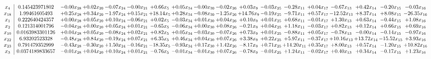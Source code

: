 \documentclass[9pt]{article}
\begin{document}
\[\begin{array}{c| c c@{\hskip 2pt} c@{\hskip 2pt} c@{\hskip 2pt} c@{\hskip 2pt} c@{\hskip 2pt} c@{\hskip 2pt} c@{\hskip 2pt} c@{\hskip 2pt} c@{\hskip 2pt} c@{\hskip 2pt} c@{\hskip 2pt} c@{\hskip 2pt} c@{\hskip 2pt} c@{\hskip 2pt} c@{\hskip 2pt} c@{\hskip 2pt} }
 x_{4}   &  0.145423971802 & -0.00 x_{28} & +  0.02 x_{20} & -0.07 x_{24} & -0.00 x_{21} & +  0.66 x_{5} & +  0.05 x_{34} & -0.00 x_{30} & -0.02 x_{26} & +  0.03 x_{9} & -0.03 x_{25} & -0.28 x_{11} & +  0.04 x_{17} & -0.67 x_{13} & +  0.42 x_{14} & -0.20 x_{15} & -0.03 x_{16}\\
 x_{18}   &  1.99461605493 & +  0.25 x_{28} & +  0.34 x_{20} & -1.97 x_{24} & +  0.15 x_{21} & + 18.14 x_{5} & +  0.28 x_{34} & -0.08 x_{30} & -1.25 x_{26} & + 14.76 x_{9} & -0.19 x_{25} & -9.71 x_{11} & +  0.57 x_{17} & -12.52 x_{13} & +  8.37 x_{14} & +  8.08 x_{15} & -26.35 x_{16}\\
 x_{1}   &  0.222640424357 & +  0.00 x_{28} & +  0.05 x_{20} & +  0.10 x_{24} & -0.06 x_{21} & +  0.02 x_{5} & -0.03 x_{34} & +  0.01 x_{30} & +  0.04 x_{26} & +  0.10 x_{9} & +  0.01 x_{25} & +  0.68 x_{11} & -0.01 x_{17} & +  1.30 x_{13} & +  0.63 x_{14} & -0.44 x_{15} & +  1.08 x_{16}\\
 x_{2}   &  0.121314001796 & -0.04 x_{28} & +  0.00 x_{20} & +  0.05 x_{24} & +  0.01 x_{21} & -0.65 x_{5} & -0.06 x_{34} & +  0.00 x_{30} & +  0.08 x_{26} & -0.21 x_{9} & +  0.04 x_{25} & +  1.18 x_{11} & -0.03 x_{17} & +  0.82 x_{13} & +  0.12 x_{14} & +  0.66 x_{15} & +  0.69 x_{16}\\
 x_{10}   &  0.0163983301126 & +  0.04 x_{28} & +  0.05 x_{20} & -0.08 x_{24} & +  0.02 x_{21} & +  0.82 x_{5} & +  0.05 x_{34} & -0.03 x_{30} & -0.07 x_{26} & +  0.73 x_{9} & +  0.01 x_{25} & -0.88 x_{11} & +  0.05 x_{17} & -0.78 x_{13} & -0.00 x_{14} & -0.14 x_{15} & -0.97 x_{16}\\
 x_{22}   &  6.93202523328 & -0.48 x_{28} & +  0.84 x_{20} & -0.19 x_{24} & +  0.07 x_{21} & +  6.35 x_{5} & +  0.46 x_{34} & +  0.04 x_{30} & +  0.07 x_{26} & +  3.38 x_{9} & +  0.22 x_{25} & +  5.97 x_{11} & -0.37 x_{17} & + 10.16 x_{13} & + 13.72 x_{14} & -15.52 x_{15} & +  3.93 x_{16}\\
 x_{23}   &  0.791479352999 & -0.43 x_{28} & -0.30 x_{20} & +  1.50 x_{24} & -0.16 x_{21} & -18.35 x_{5} & -0.93 x_{34} & +  0.17 x_{30} & +  1.42 x_{26} & -8.17 x_{9} & +  0.71 x_{25} & + 14.20 x_{11} & +  0.35 x_{17} & +  8.00 x_{13} & +  0.57 x_{14} & -1.20 x_{15} & + 10.82 x_{16}\\
 x_{3}   &  0.0374189833657 & -0.01 x_{28} & +  0.04 x_{20} & +  0.10 x_{24} & +  0.01 x_{21} & -0.76 x_{5} & -0.01 x_{34} & -0.01 x_{30} & +  0.07 x_{26} & -0.78 x_{9} & -0.01 x_{25} & +  1.24 x_{11} & -0.02 x_{17} & +  0.40 x_{13} & +  0.34 x_{14} & -0.17 x_{15} & +  1.23 x_{16}\\

\end{array}\]
\end{document}
